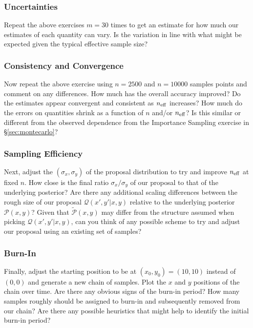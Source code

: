 \documentclass[12pt, titlepage]{article}
\newcommand{\posterior}{\ensuremath{\mathcal{P}}}
\newcommand{\proposal}{\ensuremath{\mathcal{Q}}}
\begin{document}
\subsubsection*{Uncertainties}

Repeat the above exercises $m=30$ times to get an
estimate for how much our estimates of each quantity can vary.
Is the variation in line with what might be expected given 
the typical effective sample size?

\subsubsection*{Consistency and Convergence}

Now repeat the above exercise using $n=2500$ and $n=10000$ samples
points and comment on any differences.
How much has the overall accuracy improved? Do
the estimates appear convergent and consistent as $n_{\rm eff}$ increases? 
How much do the errors on quantities shrink as a function 
of $n$ and/or $n_{\rm eff}$? Is this similar or different
from the observed dependence from the Importance Sampling exercise
in \S\ref{sec:montecarlo}?

\subsubsection*{Sampling Efficiency}

Next, adjust the $(\sigma_x, \sigma_y)$ of the proposal distribution
to try and improve $n_{\rm eff}$ at fixed $n$. How close is the final
ratio $\sigma_x/\sigma_y$ of our proposal to that of the underlying
posterior? Are there any additional scaling differences between the rough
size of our proposal $\proposal(x',y'|x,y)$ relative to the
underlying posterior $\posterior(x,y)$?
Given that $\tilde{\posterior}(x,y)$ may differ from the
structure assumed when picking $\proposal(x',y'|x,y)$,
can you think of any possible scheme to try and adjust our proposal
using an existing set of samples?

\subsubsection*{Burn-In}

Finally, adjust the starting position to be at
$(x_0,y_0)=(10,10)$ instead of $(0,0)$ and generate a new chain of 
samples. Plot the $x$ and $y$ positions of the chain over time.
Are there any obvious signs of the burn-in period? How many samples
roughly should be assigned to burn-in and subsequently removed from
our chain? Are there any possible heuristics that might help to identify
the initial burn-in period?
\end{document}
